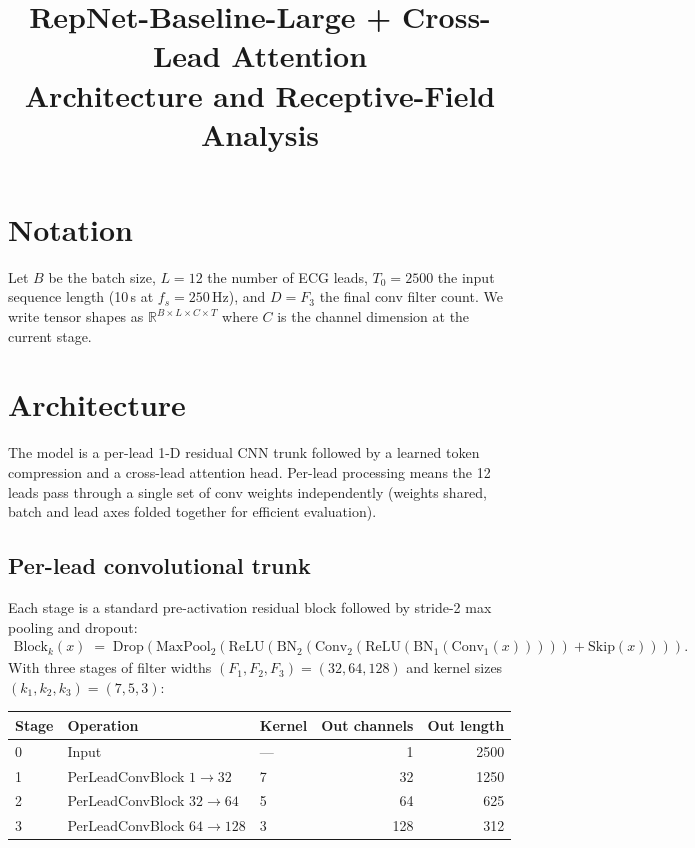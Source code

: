 \documentclass[11pt]{article}
\title{RepNet-Baseline-Large + Cross-Lead Attention\\
\large Architecture and Receptive-Field Analysis}
\author{}
\date{}
\begin{document}
\maketitle

\section{Notation}

Let $B$ be the batch size, $L = 12$ the number of ECG leads, $T_0 = 2500$ the
input sequence length (10\,s at $f_s = 250$\,Hz), and $D = F_3$ the final conv
filter count. We write tensor shapes as $\mathbb{R}^{B \times L \times C \times T}$
where $C$ is the channel dimension at the current stage.

\section{Architecture}

The model is a per-lead 1-D residual CNN trunk followed by a learned token
compression and a cross-lead attention head. Per-lead processing means the
12 leads pass through a single set of conv weights independently
(weights shared, batch and lead axes folded together for efficient evaluation).

\subsection{Per-lead convolutional trunk}

Each stage is a standard pre-activation residual block followed by stride-2
max pooling and dropout:
%
\begin{align*}
  \text{Block}_k(x) \;=\; \text{Drop}\!\left( \text{MaxPool}_2 \!\left(
    \text{ReLU}\!\left(
      \text{BN}_2\!\left(\text{Conv}_2(\text{ReLU}(\text{BN}_1(\text{Conv}_1(x))))\right) + \text{Skip}(x)
    \right)
  \right) \right).
\end{align*}
%
With three stages of filter widths $(F_1, F_2, F_3) = (32, 64, 128)$ and kernel
sizes $(k_1, k_2, k_3) = (7, 5, 3)$:

\begin{center}
\begin{tabular}{lllrr}
\toprule
Stage & Operation & Kernel & Out channels & Out length \\
\midrule
0 & Input                          & ---  & 1   & 2500 \\
1 & PerLeadConvBlock $1 \to 32$    & 7    & 32  & 1250 \\
2 & PerLeadConvBlock $32 \to 64$   & 5    & 64  &  625 \\
3 & PerLeadConvBlock $64 \to 128$  & 3    & 128 &  312 \\
\bottomrule
\end{tabular}
\end{center}
\end{document}
